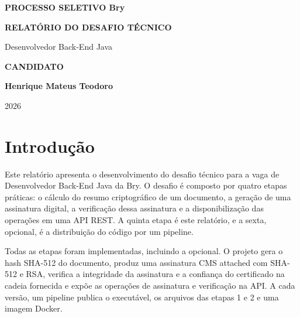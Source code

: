 \documentclass[12pt,a4paper]{article}
\begin{document}
\hypersetup{pageanchor=false}

\begin{titlepage}
    \thispagestyle{empty}
    \centering

    \vspace*{1.5cm}

    {\large\bfseries PROCESSO SELETIVO Bry\par}

    \vspace*{\fill}

    {\Huge\bfseries RELATÓRIO DO DESAFIO TÉCNICO\par}

    \vspace{0.8cm}

    {\Large Desenvolvedor Back-End Java\par}

    \vspace*{\fill}

    {\small\bfseries CANDIDATO\par}

    \vspace{0.4cm}

    {\Large\bfseries Henrique Mateus Teodoro\par}

    \vspace{2cm}

    {\large 2026\par}
\end{titlepage}

\hypersetup{pageanchor=true}
\tableofcontents
\clearpage
{}

\section{Introdução}

Este relatório apresenta o desenvolvimento do desafio técnico para a vaga de Desenvolvedor Back-End Java da Bry. O desafio é composto por quatro etapas práticas: o cálculo do resumo criptográfico de um documento, a geração de uma assinatura digital, a verificação dessa assinatura e a disponibilização das operações em uma API REST. A quinta etapa é este relatório, e a sexta, opcional, é a distribuição do código por um pipeline.

Todas as etapas foram implementadas, incluindo a opcional. O projeto gera o hash SHA-512 do documento, produz uma assinatura CMS attached com SHA-512 e RSA, verifica a integridade da assinatura e a confiança do certificado na cadeia fornecida e expõe as operações de assinatura e verificação na API. A cada versão, um pipeline publica o executável, os arquivos das etapas 1 e 2 e uma imagem Docker.
\end{document}
